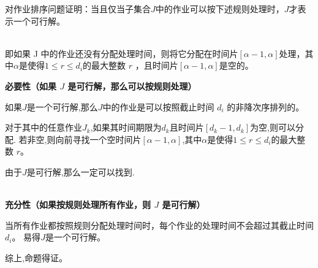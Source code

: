 \documentclass[../../main.tex]{subfiles}
\begin{document}
\begin{problem}
对作业排序问题证明：当且仅当子集合\( J \)中的作业可以按下述规则处理时，\(J\)才表示一个可行解。

~\\
即如果 J 中的作业还没有分配处理时间，则将它分配在时间片\([\alpha -1,\alpha]\)处理，其中\(\alpha\)是使得\(1 \leq r \leq d_i\)的最大整数 \(r\) ，且时间片\([\alpha -1,\alpha]\)是空的。
\end{problem}
\begin{solution}

\textbf{必要性（如果 \( J \) 是可行解，那么可以按规则处理）}

如果\(J\)是一个可行解,那么\(J\)中的作业是可以按照截止时间 \( d_i \) 的非降次序排列的。

对于其中的任意作业\(J_k\),如果其时间期限为\(d_k\)且时间片\([d_k-1,d_k]\)为空,则可以分配.
若非空,则向前寻找一个空时间片\([\alpha-1,\alpha]\),其中\(\alpha\)是使得\(1 \leq r \leq d_i\)的最大整数 \(r\)。

由于\(J\)是可行解,那么一定可以找到.

~\\
\textbf{充分性（如果按规则处理所有作业，则 \( J \) 是可行解）}

当所有作业都按照规则分配处理时间时，每个作业的处理时间不会超过其截止时间 \( d_i \)。
易得\(J\)是一个可行解。


综上,命题得证。
\end{solution}
\end{document}
